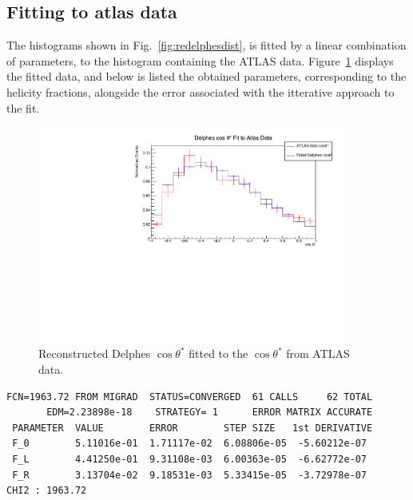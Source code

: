 \documentclass[12pt,a4paper]{article}
\numberwithin{equation}{section}
\begin{document}
\subsection{Fitting to atlas data}
The histograms shown in Fig.~\ref{fig:redelphesdist}, is fitted by a linear
combination of parameters, to the histogram containing the ATLAS data.
Figure~\ref{fig:delphesfit} displays the fitted data, and below is listed the
obtained parameters, corresponding to the helicity fractions, alongside the
error associated with the itterative approach to the fit.

\begin{figure}[H]
  \centering
  \includegraphics[width=0.9\textwidth]{figures/delphes_fit}
  \caption{\label{fig:delphesfit}Reconstructed Delphes $\cos \theta^{*}$ fitted to
    the $\cos \theta^{*}$ from ATLAS data.}
\end{figure}

\begin{verbatim}
FCN=1963.72 FROM MIGRAD  STATUS=CONVERGED  61 CALLS     62 TOTAL
       EDM=2.23898e-18    STRATEGY= 1      ERROR MATRIX ACCURATE
 PARAMETER  VALUE        ERROR        STEP SIZE   1st DERIVATIVE
 F_0        5.11016e-01  1.71117e-02  6.08806e-05  -5.60212e-07
 F_L        4.41250e-01  9.31108e-03  6.00363e-05  -6.62772e-07
 F_R        3.13704e-02  9.18531e-03  5.33415e-05  -3.72978e-07
CHI2 : 1963.72
\end{verbatim}
\end{document}
